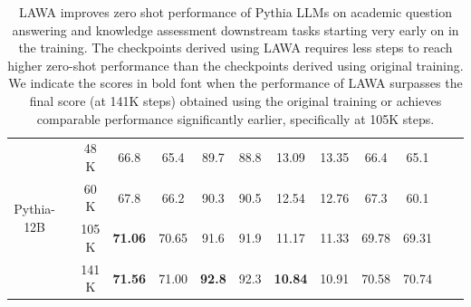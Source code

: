 \documentclass{article}
\newcommand{\method}{LAWA}
\begin{document}
\begin{table}[t]
{\begin{tabular}{ccccccccccccc}
    \midrule
    \multirow{4}{*}{Pythia-12B} 
    & & 48 K  & 66.8 & 65.4     & 89.7 & 88.8   & 13.09  & 13.35    & 66.4 & 65.1 & \\
    & & 60 K  & 67.8 & 66.2     & 90.3 & 90.5   & 12.54  & 12.76    & 67.3 & 60.1 & \\
    & & 105 K & \textbf{71.06} & 70.65   & 91.6 & 91.9  & 11.17 & 11.33     & 69.78 & 69.31 & \\
    & & 141 K & \textbf{71.56} & 71.00   & \textbf{92.8} & 92.3   & \textbf{10.84} & 10.91     & 70.58 & 70.74 & \\
    \bottomrule
  \end{tabular}}
  \vspace{0.5em}
  \caption{\method{} improves zero shot performance of Pythia LLMs on academic question answering and knowledge assessment downstream tasks starting very early on in the training. The checkpoints derived using \method{} requires less steps to reach higher zero-shot performance than the checkpoints derived using original training. We indicate the scores in bold font when the performance of \method{} surpasses the final score (at 141K steps) obtained using the original training or achieves comparable performance significantly earlier, specifically at 105K steps.}
  \label{table:zeroshot}
\end{table}
\end{document}
